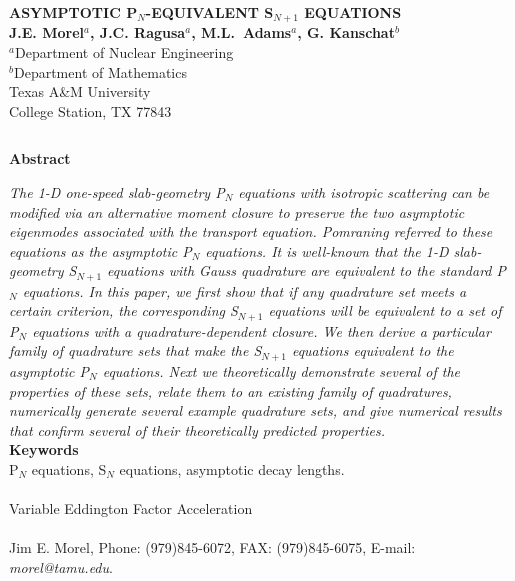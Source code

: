 \documentclass[12pt]{article}
\date{}
\newcommand{\bc}{\begin{center}}
\newcommand{\ec}{\end{center}}
\newcommand{\ess}{\doublespacing}
\begin{document}
%

\thispagestyle{empty}
\bc
{\Large \bf ASYMPTOTIC P$_N$-EQUIVALENT S$_{N+1}$ EQUATIONS}\\
\vspace{0.5in}
{\large {\bf J.E. Morel$^{a}$, J.C. Ragusa$^{a}$, M.L.\ Adams$^{a}$, G. Kanschat$^{b}$}\\
$ $\\
$^a$Department of Nuclear Engineering\\
$^b$Department of Mathematics\\
Texas A\&M University\\
College Station, TX 77843}\\
\ec
$ $\\
\bc
{\large \bf Abstract}\\
\ec
\noindent
\emph{
The 1-D one-speed slab-geometry P$_N$ equations with isotropic scattering can be 
modified via an alternative moment closure to preserve the two asymptotic eigenmodes 
associated with the transport equation.  Pomraning referred to these equations as 
the asymptotic P$_N$ equations. It is well-known that the 1-D slab-geometry S$_{N+1}$ 
equations with Gauss quadrature are equivalent to the standard P$_{N}$ equations.  
In this paper, we first show that if any quadrature set meets a certain criterion, 
the corresponding S$_{N+1}$ equations will be equivalent to a set of P$_N$ equations with a 
quadrature-dependent closure.  We then derive a particular family of quadrature sets that make 
the S$_{N+1}$ equations equivalent to the asymptotic P$_N$ equations. Next we theoretically demonstrate 
several of the properties of these sets, relate them to an existing family of quadratures, 
numerically generate several example quadrature sets, and give numerical results that 
confirm several of their theoretically predicted properties.
}\\
$ $\\
\noindent
{\bf Keywords}\\
\noindent P$_N$ equations, S$_N$ equations, asymptotic decay lengths.\\
$ $\\
\\
\noindent Variable Eddington Factor Acceleration \\
$ $\\
\\
\noindent Jim E. Morel, Phone: (979)845-6072, FAX: (979)845-6075, E-mail: \emph{morel@tamu.edu}.
$ $\\
\newpage
\ess
\end{document}
